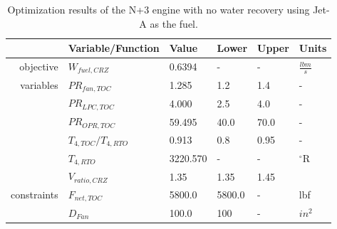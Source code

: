 \documentclass[conf]{new-aiaa}
\begin{document}
\begin{table}[hbt!]
    \centering
    \caption{Optimization results of the N+3 engine with no water recovery using Jet-A as the fuel.
    }
    \small
    \renewcommand{\arraystretch}{1.2}
    \begin{tabular}{r l l l l l}
                    & Variable/Function     & Value    & Lower  & Upper & Units           \\
        \toprule
        objective   & $W_{fuel,CRZ}$        & 0.6394   & -      & -     & $\frac{lbm}{s}$ \\
        \hline
        variables   & $PR_{fan,TOC}$        & 1.285    & 1.2    & 1.4   & -               \\
                    & $PR_{LPC,TOC}$        & 4.000    & 2.5    & 4.0   & -               \\
                    & $PR_{OPR,TOC}$        & 59.495   & 40.0   & 70.0  & -               \\
                    & $T_{4,TOC}/T_{4,RTO}$ & 0.913    & 0.8    & 0.95  & -               \\
                    & $T_{4,RTO}$           & 3220.570 & -      & -     & $^\circ$R       \\
                    & $V_{ratio,CRZ}$       & 1.35     & 1.35   & 1.45  &                 \\
        \hline
        constraints & $F_{net,TOC}$         & 5800.0   & 5800.0 & -     & lbf             \\
                    & $D_{Fan}$             & 100.0    & 100    & -     & $in^2$          \\
        \bottomrule
    \end{tabular}
    \label{tab:res_thermo_opt_JetA}
\end{table}
\end{document}

